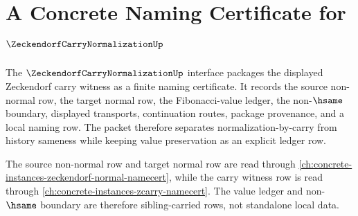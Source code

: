 \chapter{A Concrete Naming Certificate for $\ZeckendorfCarryNormalizationUp$}
\label{ch:concrete-instances-zeckendorf-carry-normalization-namecert}

The $\ZeckendorfCarryNormalizationUp$ interface packages the displayed
Zeckendorf carry witness as a finite naming certificate. It records the
source non-normal row, the target normal row, the Fibonacci-value ledger, the
non-$\hsame$ boundary, displayed transports, continuation routes, package
provenance, and a local naming row. The packet therefore separates
normalization-by-carry from history sameness while keeping value preservation
as an explicit ledger row.

The source non-normal row and target normal row are read through
\autoref{ch:concrete-instances-zeckendorf-normal-namecert}, while the carry
witness row is read through \autoref{ch:concrete-instances-zcarry-namecert}.
The value ledger and non-$\hsame$ boundary are therefore sibling-carried rows,
not standalone local data.

